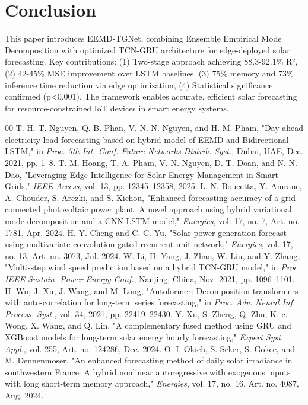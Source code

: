\documentclass[conference]{IEEEtran}
\begin{document}
\section{Conclusion}
This paper introduces EEMD-TGNet, combining Ensemble Empirical Mode Decomposition with optimized TCN-GRU architecture for edge-deployed solar forecasting. Key contributions: (1) Two-stage approach achieving 88.3-92.1\% R², (2) 42-45\% MSE improvement over LSTM baselines, (3) 75\% memory and 73\% inference time reduction via edge optimization, (4) Statistical significance confirmed (p<0.001). The framework enables accurate, efficient solar forecasting for resource-constrained IoT devices in smart energy systems.

\begin{thebibliography}{00}
 T. H. T. Nguyen, Q. B. Phan, V. N. N. Nguyen, and H. M. Pham, "Day-ahead electricity load forecasting based on hybrid model of EEMD and Bidirectional LSTM," in \textit{Proc. 5th Int. Conf. Future Networks Distrib. Syst.}, Dubai, UAE, Dec. 2021, pp. 1--8.
 T.-M. Hoang, T.-A. Pham, V.-N. Nguyen, D.-T. Doan, and N.-N. Dao, "Leveraging Edge Intelligence for Solar Energy Management in Smart Grids," \textit{IEEE Access}, vol. 13, pp. 12345--12358, 2025.
 L. N. Boucetta, Y. Amrane, A. Chouder, S. Arezki, and S. Kichou, "Enhanced forecasting accuracy of a grid-connected photovoltaic power plant: A novel approach using hybrid variational mode decomposition and a CNN-LSTM model," \textit{Energies}, vol. 17, no. 7, Art. no. 1781, Apr. 2024.
 H.-Y. Cheng and C.-C. Yu, "Solar power generation forecast using multivariate convolution gated recurrent unit network," \textit{Energies}, vol. 17, no. 13, Art. no. 3073, Jul. 2024.
 W. Li, H. Yang, J. Zhao, W. Liu, and Y. Zhang, "Multi-step wind speed prediction based on a hybrid TCN-GRU model," in \textit{Proc. IEEE Sustain. Power Energy Conf.}, Nanjing, China, Nov. 2021, pp. 1096--1101.
 H. Wu, J. Xu, J. Wang, and M. Long, "Autoformer: Decomposition transformers with auto-correlation for long-term series forecasting," in \textit{Proc. Adv. Neural Inf. Process. Syst.}, vol. 34, 2021, pp. 22419--22430.
 Y. Xu, S. Zheng, Q. Zhu, K.-c. Wong, X. Wang, and Q. Lin, "A complementary fused method using GRU and XGBoost models for long-term solar energy hourly forecasting," \textit{Expert Syst. Appl.}, vol. 255, Art. no. 124286, Dec. 2024.
 O. I. Okieh, S. Seker, S. Gokce, and M. Dennenmoser, "An enhanced forecasting method of daily solar irradiance in southwestern France: A hybrid nonlinear autoregressive with exogenous inputs with long short-term memory approach," \textit{Energies}, vol. 17, no. 16, Art. no. 4087, Aug. 2024.
\end{thebibliography}
\end{document}
